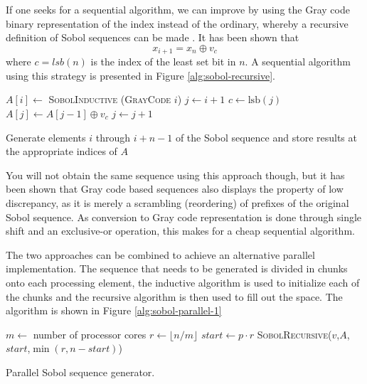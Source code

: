 If one seeks for a sequential algorithm, we can improve by using the
Gray code binary representation of the index instead of the ordinary,
whereby a recursive definition of Sobol sequences can be made
. It has been shown that
$$x_{i+1} = x_n \oplus v_c$$
where $c = \mathit{lsb}(n)$ is the index of the least set bit in
$n$. A sequential algorithm using this strategy is presented in Figure
\ref{alg:sobol-recursive}.

\begin{algorithm}
  \begin{algorithmic}
    \State $A[i] \gets$ \textsc{SobolInductive} (\textsc{GrayCode} $i$)
    \State $j \gets i + 1$
    \State $c \gets \mathrm{lsb}(j)$
    \State $A[j] \gets A[j-1] \oplus v_c$
    \State $j \gets j + 1$
    \EndWhile
    \EndFunction
  \end{algorithmic}
  \caption{Generate elements $i$ through $i+n-1$ of the Sobol
    sequence and store results at the appropriate indices of $A$}
  \label{alg:sobol-recursive}
\end{algorithm}

You will not obtain the same sequence using this approach though, but
it has been shown  that Gray code based sequences also
displays the property of low discrepancy, as it is merely a scrambling
(reordering) of prefixes of the original Sobol sequence. As conversion
to Gray code representation is done through single shift and an
exclusive-or operation, this makes for a cheap sequential algorithm.

The two approaches can be combined to achieve an alternative parallel
implementation. The sequence that needs to be generated is divided in
chunks onto each processing element, the inductive algorithm is used
to initialize each of the chunks and the recursive algorithm is then
used to fill out the space. The algorithm is shown in Figure
\ref{alg:sobol-parallel-1}

\begin{algorithm}
  \todo{remember to normalise to $(0,1]$}
  \begin{algorithmic}
    \State $m \gets$ number of processor cores
    \State $r \gets \lfloor n/m \rfloor$
    \State $start \gets p\cdot r$
    \State \textsc{SobolRecursive}($v$,$A$,$start$,$\min(r,n-start)$)
    \EndParFor
    \EndFunction
  \end{algorithmic}
  \caption{Parallel Sobol sequence generator.}
  \label{alg:sobol-parallel-1}
\end{algorithm}

